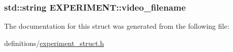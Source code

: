 \subsubsection[{\texorpdfstring{video\+\_\+filename}{video\_filename}}]{\setlength{\rightskip}{0pt plus 5cm}std\+::string E\+X\+P\+E\+R\+I\+M\+E\+N\+T\+::video\+\_\+filename}\hypertarget{structEXPERIMENT_a7095f959a6d88f3a5997bcd0f4579609}{}\label{structEXPERIMENT_a7095f959a6d88f3a5997bcd0f4579609}


The documentation for this struct was generated from the following file\+:\begin{DoxyCompactItemize}
\item 
definitions/\hyperlink{experiment__struct_8h}{experiment\+\_\+struct.\+h}\end{DoxyCompactItemize}
